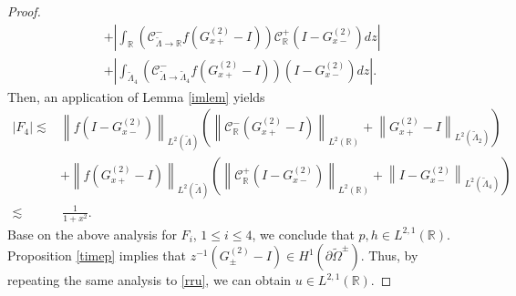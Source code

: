 \documentclass[preprint,compress,12pt]{elsarticle}
\numberwithin{equation}{section}
\begin{document}
\begin{proof}
\begin{equation*}
\begin{aligned}
&+\left|\int_{\mathbb{R}}\left(\mathcal{C}_{\widetilde{\Lambda}\rightarrow\mathbb{R}}^{-}f\left(G^{(2)}_{x+}-I\right)\right)\mathcal{C}_{\mathbb{R}}^{+}\left(I-G^{(2)}_{x-}\right)dz\right|\\
&+\left|\int_{\widetilde{\Lambda}_{4}}\left(\mathcal{C}_{\widetilde{\Lambda}\rightarrow\widetilde{\Lambda}_{4}}^{-}f\left(G^{(2)}_{x+}-I\right)\right)\left(I-G^{(2)}_{x-}\right)dz\right|.
\end{aligned}
\end{equation*}
Then, an application of Lemma \ref{imlem} yields
\begin{equation*}
\begin{aligned}
\left|F_{4}\right|
\lesssim&\left\|f\left(I-G^{(2)}_{x-}\right)\right\|_{L^{2}(\widetilde{\Lambda})}\left(\left\|\mathcal{C}_{\mathbb{R}}^{-}\left(G^{(2)}_{x+}-I\right)\right\|_{L^{2}(\mathbb{R})}+\left\|G^{(2)}_{x+}-I\right\|_{L^{2}(\widetilde{\Lambda}_{2})}\right)\\
&+\left\|f\left(G^{(2)}_{x+}-I\right)\right\|_{L^{2}(\widetilde{\Lambda})}\left(\left\|\mathcal{C}_{\mathbb{R}}^{+}\left(I-G^{(2)}_{x-}\right)\right\|_{L^{2}(\mathbb{R})}+\left\|I-G^{(2)}_{x-}\right\|_{L^{2}(\widetilde{\Lambda}_{4})}\right)\\
\lesssim&\,\frac{1}{1+x^{2}}.
\end{aligned}
\end{equation*}
Base on the above analysis for $F_{i}$, $1\leq i\leq4$, we conclude that $p,h\in L^{2,1}(\mathbb{R})$. Proposition \ref{timep} implies that $z^{-1}(G^{(2)}_{\pm}-I )\in H^{1}(\partial\widetilde{\Omega}^{\pm})$. Thus, by repeating the same analysis to \eqref{rru}, we can obtain $u\in L^{2,1}(\mathbb{R})$.



\end{proof}
\end{document}

